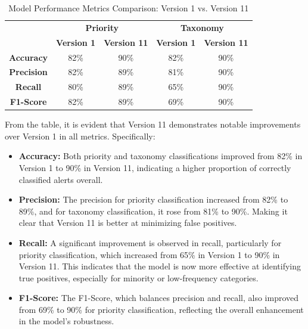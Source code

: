 \clearpage

\begin{table}[h!]
    \centering
    \begin{tabular}{@{}ccccc@{}}
        \toprule
        \multirow{2}{0em}{} & \multicolumn{2}{c}{\textbf{Priority}} & \multicolumn{2}{c}{\textbf{Taxonomy}} \\
        & \textbf{Version 1} & \textbf{Version 11} & \textbf{Version 1} & \textbf{Version 11} \\
        \hline
        \textbf{Accuracy} & 82\% & 90\% & 82\% & 90\% \\
        \textbf{Precision} & 82\% & 89\% & 81\% & 90\% \\
        \textbf{Recall} & 80\% & 89\% & 65\% & 90\% \\
        \textbf{F1-Score} & 82\% & 89\% & 69\% & 90\% \\
        \bottomrule
    \end{tabular}
    \caption{Model Performance Metrics Comparison: Version 1 vs. Version 11}
    \label{tab:results_comparative}
\end{table}

From the table, it is evident that Version 11 demonstrates notable improvements over Version 1 in all metrics. Specifically:

\begin{itemize}
    \item \textbf{Accuracy:} Both priority and taxonomy classifications improved from 82\% in Version 1 to 90\% in Version 11, indicating a higher proportion of correctly classified alerts overall.
    \item \textbf{Precision:} The precision for priority classification increased from 82\% to 89\%, and for taxonomy classification, it rose from 81\% to 90\%. Making it clear that Version 11 is better at minimizing false positives.
    \item \textbf{Recall:} A significant improvement is observed in recall, particularly for priority classification, which increased from 65\% in Version 1 to 90\% in Version 11. This indicates that the model is now more effective at identifying true positives, especially for minority or low-frequency categories.
    \item \textbf{F1-Score:} The F1-Score, which balances precision and recall, also improved from 69\% to 90\% for priority classification, reflecting the overall enhancement in the model's robustness.
\end{itemize}

